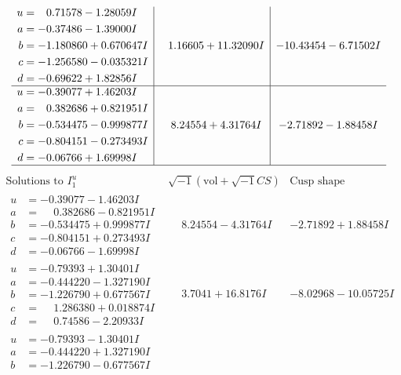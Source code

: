 \documentclass[1p]{elsarticle_modified}
\theoremstyle{definition}
\newcommand{\I}{\sqrt{-1}}
\begin{document}
$$\begin{array}{c|c|c}
\begin{aligned}
u &= \phantom{-}0.71578 - 1.28059 I \\
a &= -0.37486 - 1.39000 I \\
b &= -1.180860 + 0.670647 I \\
c &= -1.256580 - 0.035321 I \\
d &= -0.69622 + 1.82856 I\end{aligned}
 & \phantom{-}1.16605 + 11.32090 I & -10.43454 - 6.71502 I \\ \hline\begin{aligned}
u &= -0.39077 + 1.46203 I \\
a &= \phantom{-}0.382686 + 0.821951 I \\
b &= -0.534475 - 0.999877 I \\
c &= -0.804151 - 0.273493 I \\
d &= -0.06766 + 1.69998 I\end{aligned}
 & \phantom{-}8.24554 + 4.31764 I & -2.71892 - 1.88458 I\\
 \hline 
 \end{array}$$\newpage$$\begin{array}{c|c|c}  
\text{Solutions to }I^u_{1}& \I (\text{vol} + \sqrt{-1}CS) & \text{Cusp shape}\\
 \hline 
\begin{aligned}
u &= -0.39077 - 1.46203 I \\
a &= \phantom{-}0.382686 - 0.821951 I \\
b &= -0.534475 + 0.999877 I \\
c &= -0.804151 + 0.273493 I \\
d &= -0.06766 - 1.69998 I\end{aligned}
 & \phantom{-}8.24554 - 4.31764 I & -2.71892 + 1.88458 I \\ \hline\begin{aligned}
u &= -0.79393 + 1.30401 I \\
a &= -0.444220 - 1.327190 I \\
b &= -1.226790 + 0.677567 I \\
c &= \phantom{-}1.286380 + 0.018874 I \\
d &= \phantom{-}0.74586 - 2.20933 I\end{aligned}
 & \phantom{-}3.7041 + 16.8176 I & -8.02968 - 10.05725 I \\ \hline\begin{aligned}
u &= -0.79393 - 1.30401 I \\
a &= -0.444220 + 1.327190 I \\
b &= -1.226790 - 0.677567 I \\

\end{aligned}
\end{array}$$
\end{document}
